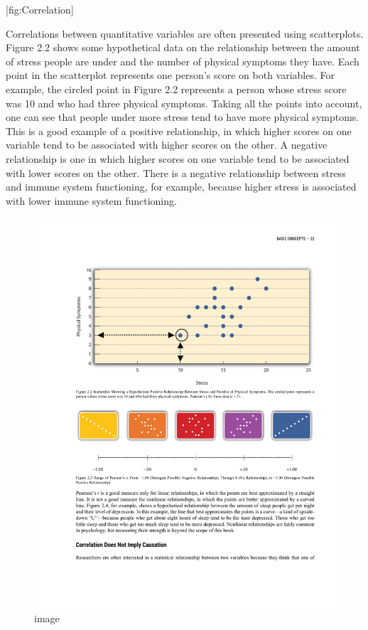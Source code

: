\documentclass[]{book}
\theoremstyle{definition}
\theoremstyle{definition}
\theoremstyle{remark}
\begin{document}
{[}fig:Correlation{]}

Correlations between quantitative variables are often presented using
scatterplots. Figure 2.2 shows some hypothetical data on the
relationship between the amount of stress people are under and the
number of physical symptoms they have. Each point in the scatterplot
represents one person's score on both variables. For example, the
circled point in Figure 2.2 represents a person whose stress score was
10 and who had three physical symptoms. Taking all the points into
account, one can see that people under more stress tend to have more
physical symptoms. This is a good example of a positive relationship, in
which higher scores on one variable tend to be associated with higher
scores on the other. A negative relationship is one in which higher
scores on one variable tend to be associated with lower scores on the
other. There is a negative relationship between stress and immune system
functioning, for example, because higher stress is associated with lower
immune system functioning.

\begin{figure}[htbp]
\centering
\includegraphics{figures/C2F4Correlation2.pdf}
\caption{image}
\end{figure}
\end{document}
